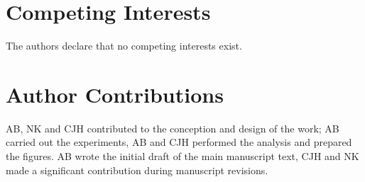 \documentclass[10pt,letterpaper]{article}
\begin{document}
\section*{Competing Interests}
The authors declare that no competing interests exist.



\section*{Author Contributions}
AB, NK and CJH contributed to the conception and design of the work;
AB carried out the experiments, AB and CJH performed the analysis and
prepared the figures. AB wrote the initial draft of the main
manuscript text, CJH and NK made a significant contribution during
manuscript revisions.
\end{document}
